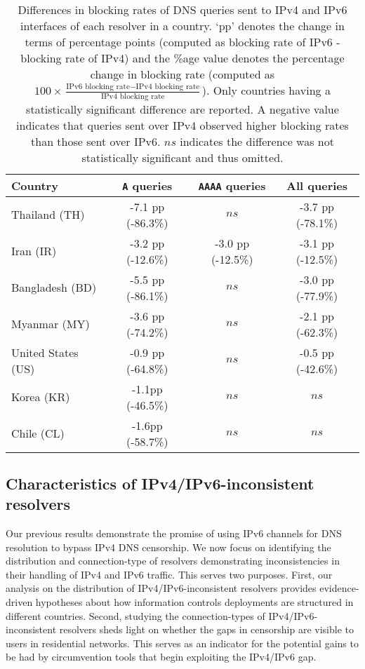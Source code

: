 \begin{table}[t]
  \centering
  \small
  \scalebox{\tabularscale} {
  \begin{tabular}{lccc}%
    \toprule
    {\bf Country}&{\bf {\tt A} queries }&{\bf {\tt AAAA} queries} & {\bf All queries}
    \\ \midrule
    Thailand (TH)      & -7.1 pp (-86.3\%) & $ns$              & -3.7 pp (-78.1\%) \\
    Iran (IR)          & -3.2 pp (-12.6\%) & -3.0 pp (-12.5\%) & -3.1 pp (-12.5\%) \\ 
    Bangladesh (BD)    & -5.5 pp (-86.1\%) & $ns$              & -3.0 pp (-77.9\%) \\
    Myanmar (MY)       & -3.6 pp (-74.2\%) & $ns$              & -2.1 pp (-62.3\%) \\
    United States (US) & -0.9 pp (-64.8\%) & $ns$              & -0.5 pp (-42.6\%) \\
    \midrule
    Korea (KR)         & -1.1pp (-46.5\%) & $ns$    & $ns$ \\
    Chile (CL)         & -1.6pp (-58.7\%)  & $ns$    & $ns$ \\
    \bottomrule
  \end{tabular}
  }
  \caption{Differences in blocking rates of DNS queries sent to IPv4 and IPv6
  interfaces of each resolver in a country. `pp' denotes the change in
  terms of percentage points (computed as blocking rate of IPv6 - blocking
  rate of IPv4) and the \%age value denotes the percentage change in blocking rate
  (computed as 
  $
  100 \times \frac{\text{IPv6 blocking rate} - \text{IPv4 blocking rate}}
  {\text{IPv4 blocking rate}}
  $). 
  Only countries having a statistically
  significant difference are reported. A negative value indicates that queries
  sent over IPv4 observed higher blocking rates than those sent over IPv6. $ns$
  indicates the difference was not statistically significant and thus omitted.}
  \label{tab:infrastructure:countries}
\end{table}

\subsection{Characteristics of IPv4/IPv6-inconsistent resolvers}
\label{sec:infrastructure:resolvers}
%
Our previous results demonstrate the promise of using IPv6 channels for DNS
resolution to bypass IPv4 DNS censorship. We now focus on identifying the
distribution and connection-type of resolvers demonstrating inconsistencies in
their handling of IPv4 and IPv6 traffic. This serves two purposes.
%
First, our analysis on the distribution of IPv4/IPv6-inconsistent resolvers
provides evidence-driven hypotheses about how information controls deployments
are structured in different countries. 
%
Second, studying the connection-types of IPv4/IPv6-inconsistent resolvers sheds
light on whether the gaps in censorship are visible to users in residential
networks. This serves as an indicator for the potential gains to be had by
circumvention tools that begin exploiting the IPv4/IPv6 gap.

